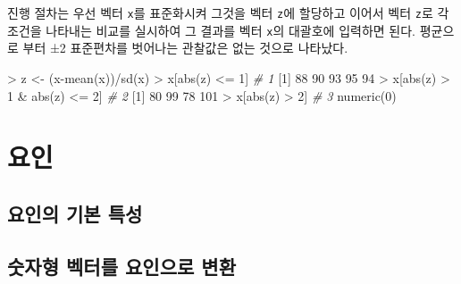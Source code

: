 \documentclass[
]{book}
\newenvironment{Shaded}{\begin{snugshade}}{\end{snugshade}}
\newcommand{\CommentTok}[1]{\textcolor[rgb]{0.56,0.35,0.01}{\textit{#1}}}
\newcommand{\DecValTok}[1]{\textcolor[rgb]{0.00,0.00,0.81}{#1}}
\newcommand{\FunctionTok}[1]{\textcolor[rgb]{0.00,0.00,0.00}{#1}}
\newcommand{\NormalTok}[1]{#1}
\newcommand{\OtherTok}[1]{\textcolor[rgb]{0.56,0.35,0.01}{#1}}
\newcommand{\SpecialCharTok}[1]{\textcolor[rgb]{0.00,0.00,0.00}{#1}}
\begin{document}
진행 절차는 우선 벡터 \texttt{x}를 표준화시켜 그것을 벡터 \texttt{z}에 할당하고 이어서 벡터 \texttt{z}로 각
조건을 나타내는 비교를 실시하여 그 결과를 벡터 \texttt{x}의 대괄호에 입력하면 된다. 평균으로
부터 ±2 표준편차를 벗어나는 관찰값은 없는 것으로 나타났다.

\begin{Shaded}
\begin{Highlighting}[]
\SpecialCharTok{\textgreater{}}\NormalTok{ z }\OtherTok{\textless{}{-}}\NormalTok{ (x}\SpecialCharTok{{-}}\FunctionTok{mean}\NormalTok{(x))}\SpecialCharTok{/}\FunctionTok{sd}\NormalTok{(x)}
\SpecialCharTok{\textgreater{}}\NormalTok{ x[}\FunctionTok{abs}\NormalTok{(z) }\SpecialCharTok{\textless{}=} \DecValTok{1}\NormalTok{]               }\CommentTok{\# 1}
\NormalTok{[}\DecValTok{1}\NormalTok{] }\DecValTok{88} \DecValTok{90} \DecValTok{93} \DecValTok{95} \DecValTok{94}
\SpecialCharTok{\textgreater{}}\NormalTok{ x[}\FunctionTok{abs}\NormalTok{(z) }\SpecialCharTok{\textgreater{}} \DecValTok{1} \SpecialCharTok{\&} \FunctionTok{abs}\NormalTok{(z) }\SpecialCharTok{\textless{}=} \DecValTok{2}\NormalTok{]  }\CommentTok{\# 2}
\NormalTok{[}\DecValTok{1}\NormalTok{]  }\DecValTok{80}  \DecValTok{99}  \DecValTok{78} \DecValTok{101}
\SpecialCharTok{\textgreater{}}\NormalTok{ x[}\FunctionTok{abs}\NormalTok{(z) }\SpecialCharTok{\textgreater{}} \DecValTok{2}\NormalTok{]                }\CommentTok{\# 3}
\FunctionTok{numeric}\NormalTok{(}\DecValTok{0}\NormalTok{)}
\end{Highlighting}
\end{Shaded}

\hypertarget{uxc694uxc778}{%
\section{요인}\label{uxc694uxc778}}

\hypertarget{uxc694uxc778uxc758-uxae30uxbcf8-uxd2b9uxc131}{%
\subsection{요인의 기본 특성}\label{uxc694uxc778uxc758-uxae30uxbcf8-uxd2b9uxc131}}

\hypertarget{uxc22buxc790uxd615-uxbca1uxd130uxb97c-uxc694uxc778uxc73cuxb85c-uxbcc0uxd658}{%
\subsection{숫자형 벡터를 요인으로 변환}\label{uxc22buxc790uxd615-uxbca1uxd130uxb97c-uxc694uxc778uxc73cuxb85c-uxbcc0uxd658}}
\end{document}

